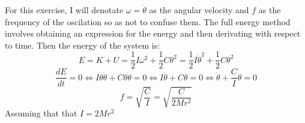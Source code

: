 \documentclass{report}
\begin{document}
  \noindent For this exercise, I will denotate $\omega=\dot{\theta}$ as the angular velocity and $f$ as the frequency of the oscilation so as not to confuse them. The full energy method involves obtaining an expression for the energy and then derivating with respect to time. Then the energy of the system is:
  \[E=K+U=\dfrac12 I\omega^2+\dfrac12 C\theta^2 = \dfrac12 I\dot{\theta}^2+\dfrac12 C\theta^2\]
  \[\dfrac{dE}{dt}=0\Longleftrightarrow I\dot{\theta}\ddot{\theta}+C\theta\dot{\theta}=0\Longleftrightarrow I\ddot{\theta}+C\theta=0 \Longleftrightarrow \ddot{\theta}+\dfrac{C}{I}\theta=0\]
  \[f=\sqrt{\dfrac{C}{I}}=\sqrt{\dfrac{C}{2Mr^2}}\]
  \noindent Assuming that that $I=2Mr^2$
  \clearpage
\end{document}
